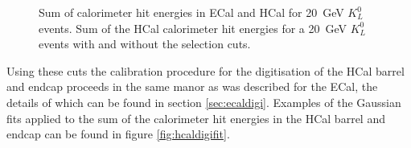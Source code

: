 \begin{figure}[h!]
\caption[\protect{} Sum of calorimeter hit energies in ECal and HCal for 20~GeV $K^{0}_{L}$ events.  \protect{} Sum of the HCal calorimeter hit energies for a 20~GeV $K^{0}_{L}$ events with and without the selection cuts.]{\protect{} Sum of calorimeter hit energies in ECal and HCal for 20~GeV $K^{0}_{L}$ events.  \protect{} Sum of the HCal calorimeter hit energies for a 20~GeV $K^{0}_{L}$ events with and without the selection cuts.}
\label{fig:hcaldigi}
\end{figure}

Using these cuts the calibration procedure for the digitisation of the HCal barrel and endcap proceeds in the same manor as was described for the ECal, the details of which can be found in section \ref{sec:ecaldigi}.  Examples of the Gaussian fits applied to the sum of the calorimeter hit energies in the HCal barrel and endcap can be found in figure \ref{fig:hcaldigifit}.  

